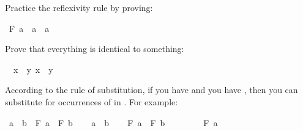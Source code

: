 \begin{isabellebody}
\isamarkupfalse%
%
\endisatagproof
{\isafoldproof}%
%
\isadelimproof
%
\endisadelimproof
%
\begin{isamarkuptext}%
\begin{Exercise} Practice the reflexivity rule by proving: \end{Exercise}%
\end{isamarkuptext}\isamarkuptrue%
\isamarkupfalse%
\ {\isachardoublequoteopen}F\ a\ {\isasymlongrightarrow}\ a\ {\isacharequal}\ a{\isachardoublequoteclose}%
\isadelimproof
\ %
\endisadelimproof
%
\isatagproof
{}\isamarkupfalse%
%
\endisatagproof
{\isafoldproof}%
%
\isadelimproof
%
\endisadelimproof
%
\begin{isamarkuptext}%
\begin{Exercise}[label = everythingissomething] Prove that everything is identical to something: \end{Exercise}%
\end{isamarkuptext}\isamarkuptrue%
\isamarkupfalse%
\ {\isachardoublequoteopen}{\isasymforall}\ x{\isachardot}\ {\isasymexists}\ y{\isachardot}\ x\ {\isacharequal}\ y{\isachardoublequoteclose}%
\isadelimproof
\ %
\endisadelimproof
%
\isatagproof
{}\isamarkupfalse%
%
\endisatagproof
{\isafoldproof}%
%
\isadelimproof
%
\endisadelimproof
%
\isadelimdocument
%
\endisadelimdocument
%
\isatagdocument
%
\isamarkuptrue%
%
\endisatagdocument
{\isafolddocument}%
%
\isadelimdocument
%
\endisadelimdocument
%
\begin{isamarkuptext}%
According to the rule of substitution, if you have   and you have ,
then you can substitute  for occurrences of  in . For example:%
\end{isamarkuptext}\isamarkuptrue%
\isamarkupfalse%
\ {\isachardoublequoteopen}a\ {\isacharequal}\ b\ {\isasymlongrightarrow}\ F\ a\ {\isasymlongrightarrow}\ F\ b{\isachardoublequoteclose}\isanewline
%
\isadelimproof
%
\endisadelimproof
%
\isatagproof
{}\isamarkupfalse%
\isanewline
\ \ \isamarkupfalse%
\ {\isachardoublequoteopen}a\ {\isacharequal}\ b{\isachardoublequoteclose}\isanewline
\ \ \isamarkupfalse%
\ {\isachardoublequoteopen}F\ a\ {\isasymlongrightarrow}\ F\ b{\isachardoublequoteclose}\isanewline
\ \ \isamarkupfalse%
\isanewline
\ \ \ \ \isamarkupfalse%
\ {\isachardoublequoteopen}F\ a{\isachardoublequoteclose}\isanewline

\end{isabellebody}
